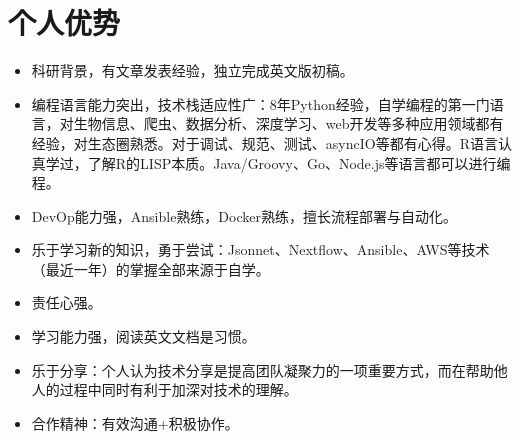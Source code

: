 \documentclass{resume}
\begin{document}
\section{个人优势}
\begin{itemize}[parsep=0.2ex]
  \item 科研背景，有文章发表经验，独立完成英文版初稿\cite{Zhao2015}。
  \item 编程语言能力突出，技术栈适应性广：8年Python经验，自学编程的第一门语言，对生物信息、爬虫、数据分析、深度学习、web开发等多种应用领域都有经验，对生态圈熟悉。对于调试、规范、测试、asyncIO等都有心得。R语言认真学过，了解R的LISP本质。Java/Groovy、Go、Node.js等语言都可以进行编程。
  \item DevOp能力强，Ansible熟练，Docker熟练，擅长流程部署与自动化。
  \item 乐于学习新的知识，勇于尝试：Jsonnet、Nextflow、Ansible、AWS等技术（最近一年）的掌握全部来源于自学。
  \item 责任心强。
  \item 学习能力强，阅读英文文档是习惯。
  \item 乐于分享：个人认为技术分享是提高团队凝聚力的一项重要方式，而在帮助他人的过程中同时有利于加深对技术的理解。
  \item 合作精神：有效沟通+积极协作。

\end{itemize}


\renewcommand\refname{发表文章}

\end{document}
